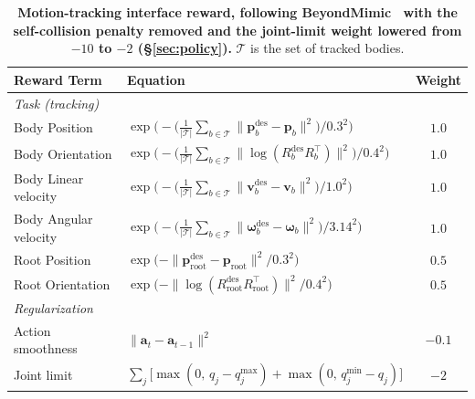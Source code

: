 \begin{table}[t]
\centering
\begin{tabular}{llc}
\toprule
\textbf{Reward Term} & \textbf{Equation} & \textbf{Weight} \\
\midrule
\multicolumn{3}{l}{\emph{Task (tracking)}}\\
Body Position
& $\displaystyle
\exp\!\Big(
-\big( \tfrac{1}{|\mathcal{T}|}
\sum_{b\in\mathcal{T}}
\|\mathbf{p}^{\mathrm{des}}_{b}-\mathbf{p}_{b}\|^{2} \big) / 0.3^{2}
\Big)$
& $1.0$\\[2mm]
Body Orientation
& $\displaystyle
\exp\!\Big(
-\big( \tfrac{1}{|\mathcal{T}|}
\sum_{b\in\mathcal{T}}
\|\log(R^{\mathrm{des}}_{b}R_{b}^{\top})\|^{2} \big) / 0.4^{2}
\Big)$
& $1.0$\\[2mm]
Body Linear velocity
& $\displaystyle
\exp\!\Big(
-\big( \tfrac{1}{|\mathcal{T}|}
\sum_{b\in\mathcal{T}}
\|\mathbf{v}^{\mathrm{des}}_{b}-\mathbf{v}_{b}\|^{2} \big) / 1.0^{2}
\Big)$
& $1.0$\\[2mm]
Body Angular velocity
& $\displaystyle
\exp\!\Big(
-\big( \tfrac{1}{|\mathcal{T}|}
\sum_{b\in\mathcal{T}}
\|\boldsymbol{\omega}^{\mathrm{des}}_{b}-\boldsymbol{\omega}_{b}\|^{2} \big) / 3.14^{2}
\Big)$
& $1.0$\\[2mm]
Root Position
& $\displaystyle
\exp\!\Big(
-\|\mathbf{p}^{\mathrm{des}}_{\text{root}}-\mathbf{p}_{\text{root}}\|^{2} / 0.3^{2}
\Big)$
& $0.5$\\[2mm]
Root Orientation
& $\displaystyle
\exp\!\Big(
-\|\log(R^{\mathrm{des}}_{\text{root}}R_{\text{root}}^{\top})\|^{2} / 0.4^{2}
\Big)$
& $0.5$\\[2mm]
\midrule
\multicolumn{3}{l}{\emph{Regularization}}\\
Action smoothness
& $\|\mathbf{a}_{t}-\mathbf{a}_{t-1}\|^{2}$
& $-0.1$\\[2mm]
Joint limit
& $\sum_{j}\big[\max(0,\,q_{j}-q_{j}^{\max}) + \max(0,\,q_{j}^{\min}-q_{j})\big]$
& $-2$\\
\bottomrule
\end{tabular}
\vspace{0.6em}
\caption{\textbf{Motion-tracking interface reward, following BeyondMimic~\citep{liao2025beyondmimic} with the self-collision penalty removed and the joint-limit weight lowered from $-10$ to $-2$ (\S\ref{sec:policy}).} $\mathcal{T}$ is the set of tracked bodies.}
\label{tab:reward-supermimic}
\end{table}

